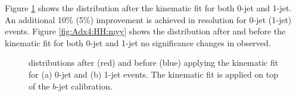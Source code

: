 Figure \ref{fig:Adx4:HH:mbb} shows the \mbb distribution after the kinematic fit for both 0-jet and 1-jet. An additional 10\% (5\%) improvement is achieved in \mbb resolution for 0-jet (1-jet) events. Figure \ref{fig:Adx4:HH:myy} shows the \myy distribution after and before the kinematic fit for both 0-jet and 1-jet no significance changes in observed.
\begin{figure}[htbp]
   \centering
   \begin{tcolorbox}[colback=black!5!white,colframe=white!75!black]
   \caption{\mbb distributions after (red) and before (blue) applying the kinematic fit for (a) 0-jet and (b) 1-jet events. The kinematic fit is applied on top of the $b$-jet calibration.}
   \label{fig:Adx4:HH:mbb}
   \end{tcolorbox}
   
\end{figure}

